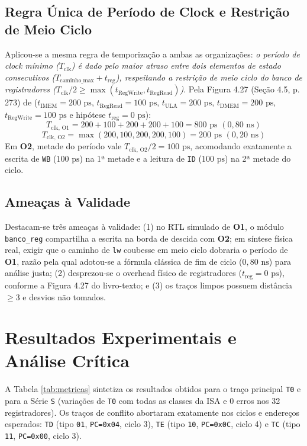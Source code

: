 \documentclass[12pt]{article}
\begin{document}
\subsection{Regra Única de Período de Clock e Restrição de Meio Ciclo}
Aplicou-se a mesma regra de temporização a ambas as organizações: \textit{o período de clock mínimo ($T_{\text{clk}}$) é dado pelo maior atraso entre dois elementos de estado consecutivos ($T_{\text{caminho\_max}} + t_{\text{reg}}$), respeitando a restrição de meio ciclo do banco de registradores ($T_{\text{clk}}/2 \ge \max(t_{\text{RegWrite}}, t_{\text{RegRead}})$)}. Pela Figura 4.27 (Seção 4.5, p. 273) de \cite{patterson2017} ($t_{\text{IMEM}} = 200\text{ ps}$, $t_{\text{RegRead}} = 100\text{ ps}$, $t_{\text{ULA}} = 200\text{ ps}$, $t_{\text{DMEM}} = 200\text{ ps}$, $t_{\text{RegWrite}} = 100\text{ ps}$ e hipótese $t_{\text{reg}} = 0\text{ ps}$):
\begin{equation}
T_{\text{clk, O1}} = 200 + 100 + 200 + 200 + 100 = 800\text{ ps } (0{,}80\text{ ns})
\end{equation}
\begin{equation}
T_{\text{clk, O2}} = \max(200, 100, 200, 200, 100) = 200\text{ ps } (0{,}20\text{ ns})
\end{equation}
Em \textbf{O2}, metade do período vale $T_{\text{clk, O2}}/2 = 100\text{ ps}$, acomodando exatamente a escrita de \texttt{WB} ($100\text{ ps}$) na 1ª metade e a leitura de \texttt{ID} ($100\text{ ps}$) na 2ª metade do ciclo.

\subsection{Ameaças à Validade}
Destacam-se três ameaças à validade: (1) no RTL simulado de \textbf{O1}, o módulo \texttt{banco\_reg} compartilha a escrita na borda de descida com \textbf{O2}; em síntese física real, exigir que o caminho de \texttt{lw} coubesse em meio ciclo dobraria o período de \textbf{O1}, razão pela qual adotou-se a fórmula clássica de fim de ciclo ($0{,}80\text{ ns}$) para análise justa; (2) desprezou-se o overhead físico de registradores ($t_{\text{reg}} = 0\text{ ps}$), conforme a Figura 4.27 do livro-texto; e (3) os traços limpos possuem distância $\ge 3$ e desvios não tomados.

\section{Resultados Experimentais e Análise Crítica}
A Tabela \ref{tab:metricas} sintetiza os resultados obtidos para o traço principal \texttt{T0} e para a Série \texttt{S} (variações de \texttt{T0} com todas as classes da ISA e 0 erros nos 32 registradores). Os traços de conflito abortaram exatamente nos ciclos e endereços esperados: \texttt{TD} (tipo \texttt{01}, \texttt{PC=0x04}, ciclo 3), \texttt{TE} (tipo \texttt{10}, \texttt{PC=0x0C}, ciclo 4) e \texttt{TC} (tipo \texttt{11}, \texttt{PC=0x00}, ciclo 3).
\end{document}
